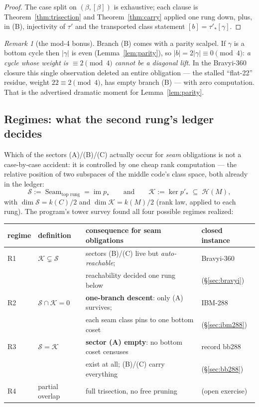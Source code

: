 \documentclass[11pt]{article}
\theoremstyle{plain}
\theoremstyle{definition}
\theoremstyle{remark}
\newtheorem{remark}[theorem]{Remark}
\newcommand{\Seam}{\operatorname{Seam}}
\newcommand{\clH}{\mathcal{H}}
\newcommand{\wt}[1]{\lvert #1\rvert}
\begin{document}
\begin{proof}
The case split on $(\beta, [\beta])$ is exhaustive; each clause is
Theorem~\ref{thm:trisection} and Theorem~\ref{thm:carry} applied one rung
down, plus, in (B), injectivity of $\tau'$ and the transported class
statement $[b] = \tau'_*[\gamma]$.
\end{proof}

\begin{remark}[the mod-4 bonus]\label{rem:mod4}
Branch (B) comes with a parity scalpel. If $\gamma$ is a bottom cycle
then $\wt\gamma$ is even (Lemma~\ref{lem:parity}), so $\wt b =
2\wt\gamma \equiv 0 \pmod 4$: \emph{a cycle whose weight is $\equiv 2
\pmod 4$ cannot be a diagonal lift}. In the Bravyi-360 closure this
single observation deleted an entire obligation --- the stalled
``flat-22'' residue, weight $22 \equiv 2 \pmod 4$, has empty branch (B)
--- with zero computation. That is the advertised dramatic moment for
Lemma~\ref{lem:parity}.
\end{remark}

\subsection{Regimes: what the second rung's ledger decides}
\label{sec:regimes}

Which of the sectors (A)/(B)/(C) actually occur for \emph{seam}
obligations is not a case-by-case accident: it is controlled by one cheap
rank computation --- the relative position of two subspaces of the middle
code's class space, both already in the ledger:
\[
\mathcal{S} := \Seam_{\text{top rung}} = \operatorname{im} p_*
\qquad\text{and}\qquad
\mathcal{K} := \ker p'_* \;\subseteq\; \clH(M),
\]
with $\dim \mathcal{S} = k(C)/2$ and $\dim \mathcal{K} = k(M)/2$ (rank
law, applied to each rung). The program's tower survey found all four
possible regimes realized:

\begin{center}
\small
\begin{tabular}{llll}
\toprule
regime & definition & consequence for seam obligations & closed instance\\
\midrule
R1 & $\mathcal{K} \subsetneq \mathcal{S}$ &
sectors (B)/(C) live but \emph{auto-reachable}; & Bravyi-360\\
& & reachability decided one rung below & (\S\ref{sec:bravyi})\\
R2 & $\mathcal{S} \cap \mathcal{K} = 0$ &
\textbf{one-branch descent}: only (A) survives; & IBM-288\\
& & each seam class pins to one bottom coset & (\S\ref{sec:ibm288})\\
R3 & $\mathcal{S} = \mathcal{K}$ &
\textbf{sector (A) empty}: no bottom coset censuses & record bb288\\
& & exist at all; (B)/(C) carry everything & (\S\ref{sec:bb288})\\
R4 & partial overlap & full trisection, no free pruning & (open exercise)\\
\bottomrule
\end{tabular}
\end{center}
\end{document}
